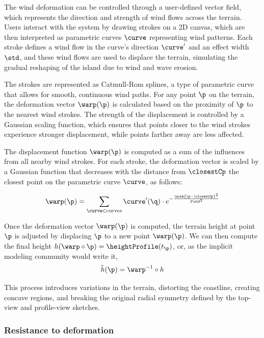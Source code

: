 The wind deformation can be controlled through a user-defined vector field, which represents the direction and strength of wind flows across the terrain. Users interact with the system by drawing strokes on a 2D canvas, which are then interpreted as parametric curves $\curve$ representing wind patterns. Each stroke defines a wind flow in the curve's direction $\curve'$ and an effect width $\std$, and these wind flows are used to displace the terrain, simulating the gradual reshaping of the island due to wind and wave erosion.

The strokes are represented as Catmull-Rom splines, a type of parametric curve that allows for smooth, continuous wind paths. For any point $\p$ on the terrain, the deformation vector $\warp(\p)$ is calculated based on the proximity of $\p$ to the nearest wind strokes. The strength of the displacement is controlled by a Gaussian scaling function, which ensures that points closer to the wind strokes experience stronger displacement, while points farther away are less affected.

The displacement function $\warp(\p)$ is computed as a sum of the influences from all nearby wind strokes. For each stroke, the deformation vector is scaled by a Gaussian function that decreases with the distance from $\closestCp$ the closest point on the parametric curve $\curve$, as follows:

\begin{align}
    \warp(\p) = \sum_{\curve \in \text{curves}} \curve'(\q) \cdot e^{-\frac{\norm{\p - \closestCp}^2}{2 \std^2}}
\end{align}


Once the deformation vector $\warp(\p)$ is computed, the terrain height at point $\p$ is adjusted by displacing $\p$ to a new point $\warp(\p)$.
We can then compute the final height $h(\warp \circ \p) = \heightProfile(t_{\p})$, or, as the implicit modeling community would write it, 
\begin{align}
    \Tilde{h}(\p) = \warp^{-1} \circ h
\end{align}

This process introduces variations in the terrain, distorting the coastline, creating concave regions, and breaking the original radial symmetry defined by the top-view and profile-view sketches.

\subsubsection{Resistance to deformation}

